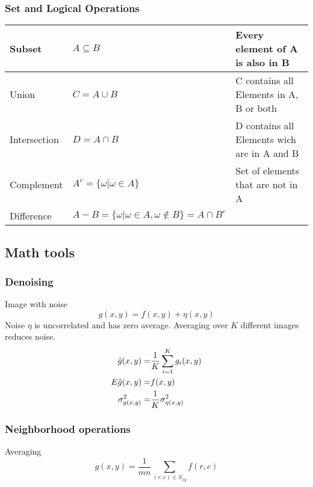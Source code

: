 \subsubsection{Set and Logical Operations}
\begin{tabular}{|l|l|l|}
	\hline
	Subset			& $A \subseteq B$						& Every element of A is also in B
	\\ \hline
	Union			& $C = A \cup B$						& C contains all Elements in A, B or both
	\\ \hline
	Intersection	& $D = A \cap B$						& D contains all Elements wich are in A and B
	\\ \hline
	Complement		& $A^c = \{ \omega | \omega \in A\}$	& Set of elements that are not in A
	\\ \hline
	Difference		& $A-B = \{ \omega | \omega \in A, \omega \notin B\} = A \cap B^c$	&
	\\ \hline
\end{tabular}


\subsection{Math tools}
\subsubsection{Denoising}
Image with noise
\begin{equation}
g(x,y) = f(x,y) + \eta(x,y)
\end{equation}
Noise $\eta$ is uncorrelated and has zero average.  Averaging over $K$ different images reduces noise.
\begin{eqnarray}
\hat{g}(x,y)      =& \frac{1}{K} \sum_{i=1}^{K}g_i(x,y) \notag \\
E{\hat{g}(x,y)}   =& f(x,y) \\
\sigma_{g(x,y)}^2 =& \frac{1}{K} \sigma_{\eta(x,y)}^2 \notag
\end{eqnarray}

\subsubsection{Neighborhood operations}
Averaging
\begin{equation}
g(x,y) = \frac{1}{mn} \sum_{(r,c)\in S_{xy}}f(r,c)
\end{equation}

